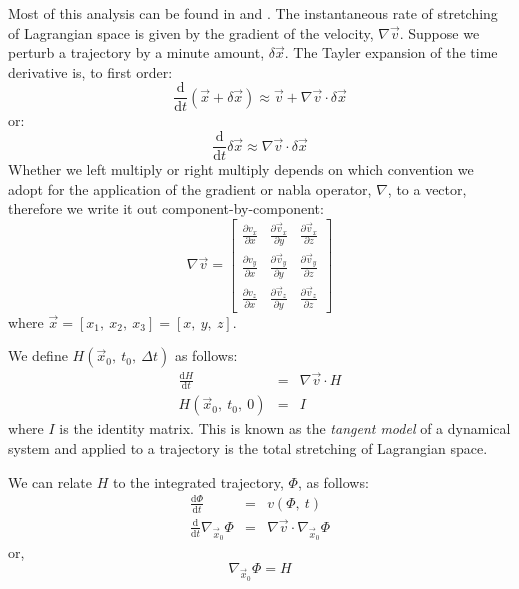 \documentclass[11pt]{article}
\begin{document}
Most of this analysis can be found in \citet{Pattanayak2001} and 
\citet{Mills2004}. 
The instantaneous rate of stretching of Lagrangian space is given by the
gradient of the velocity, $\nabla \vec v$.
Suppose we perturb a trajectory by a minute amount, $\delta \vec x$.
The Tayler expansion of the time derivative is, to first order:
\begin{equation}
\frac{\mathrm d}{\mathrm d t} (\vec x + \delta \vec x) \approx
	\vec v + \nabla \vec v \cdot \delta \vec x
\end{equation}
or:
\begin{equation}
\frac{\mathrm d}{\mathrm d t}\delta \vec x \approx \nabla \vec v \cdot \delta \vec x
\label{evolution_error_vector}
\end{equation}
Whether we left multiply or right multiply depends on which convention we adopt
for the application of the gradient or nabla operator, $\nabla$, to a vector,
therefore we write it out component-by-component:
\begin{equation}
\nabla \vec v = \left [
\begin{array}{ccc}
\frac{\partial v_x}{\partial x} & \frac{\partial \vec v_x}{\partial y} & \frac{\partial \vec v_x}{\partial z} \\
\frac{\partial v_y}{\partial x} & \frac{\partial \vec v_y}{\partial y} & \frac{\partial \vec v_y}{\partial z} \\
\frac{\partial v_z}{\partial x} & \frac{\partial \vec v_z}{\partial y} & \frac{\partial \vec v_z}{\partial z}
\end{array} \right ]
\end{equation}
where $\vec x=[x_1,~x_2,~x_3]=[x,~y,~z]$.

We define $H(\vec x_0,~t_0,~\Delta t)$ as follows:
\begin{eqnarray}
\frac{\mathrm d H}{\mathrm d t} & = & \nabla \vec v \cdot H \\
\label{deformation_matrix}
H(\vec x_0,~t_0,~0) & = & I
\end{eqnarray}
where $I$ is the identity matrix.
This is known as the {\it tangent model} of a dynamical system and applied
to a trajectory is the total stretching of Lagrangian space.

We can relate $H$ to the integrated trajectory, $\Phi$, as follows:
\begin{eqnarray}
\frac{\mathrm d \Phi}{\mathrm d t} & = & v(\Phi, ~t) \\
\frac{\mathrm d}{\mathrm d t} 
\nabla_{\vec x_0} \Phi & = & \nabla \vec v \cdot \nabla_{\vec x_0} \Phi
\end{eqnarray}
or,
\begin{equation}
\nabla_{\vec x_0} \Phi = H
\label{advection_eqn}
\end{equation}
\end{document}
